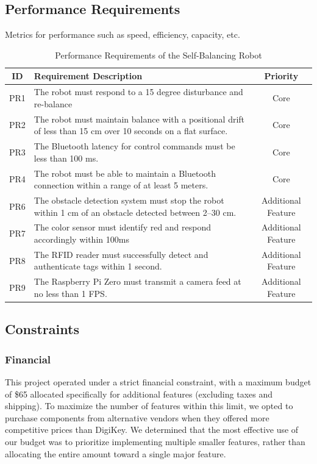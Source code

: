 \documentclass{article}
\begin{document}
\subsection{Performance Requirements}
Metrics for performance such as speed, efficiency, capacity, etc.

\begin{table}[H]
    \centering
    \renewcommand{\arraystretch}{1.3} %
    \begin{tabularx}{\textwidth}{|c|X|c|}
        \hline
        \textbf{ID} & \textbf{Requirement Description} & \textbf{Priority} \\
        \hline
        PR1 & The robot must respond to a 15 degree disturbance and re-balance & Core \\
        \hline
        PR2 & The robot must maintain balance with a positional drift of less than 15 cm over 10 seconds on a flat surface. & Core \\
        \hline
        PR3 & The Bluetooth latency for control commands must be less than 100 ms. & Core \\
        \hline
        PR4 & The robot must be able to maintain a Bluetooth connection within a range of at least 5 meters. & Core \\
        \hline
        PR6 & The obstacle detection system must stop the robot within 1 cm of an obstacle detected between 2–30 cm. & Additional Feature \\
        \hline
        PR7 & The color sensor must identify red and respond accordingly within 100ms & Additional Feature \\
        \hline
        PR8 & The RFID reader must successfully detect and authenticate tags within 1 second. & Additional Feature \\
        \hline
        PR9 & The Raspberry Pi Zero must transmit a camera feed at no less than 1 FPS. & Additional Feature \\
        \hline
    \end{tabularx}
    \caption{Performance Requirements of the Self-Balancing Robot}
    \label{tab:performance_requirements}
\end{table}

\subsection{Constraints}

\subsubsection{Financial}
This project operated under a strict financial constraint, with a maximum budget of \$65 allocated specifically for additional features (excluding taxes and shipping). To maximize the number of features within this limit, we opted to purchase components from alternative vendors when they offered more competitive prices than DigiKey. We determined that the most effective use of our budget was to prioritize implementing multiple smaller features, rather than allocating the entire amount toward a single major feature.
\end{document}
